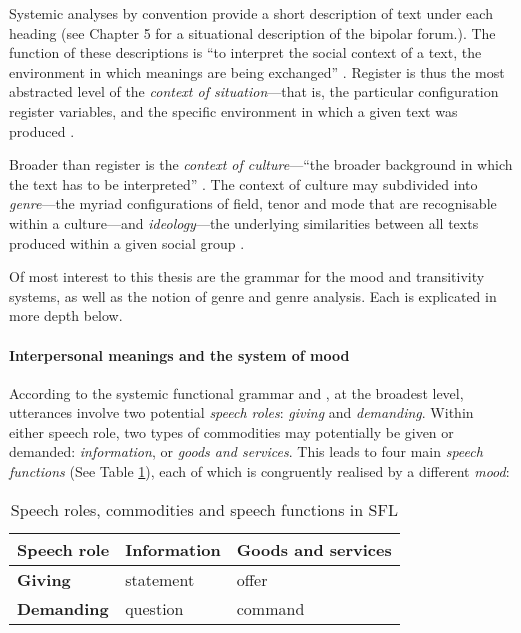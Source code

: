 	  Systemic analyses by convention provide a short description of text under each heading (see Chapter 5 for a situational description of the bipolar forum.). The function of these descriptions is ``to interpret the social context of a text, the environment in which meanings are being exchanged'' \cite[p.~12]{halliday_language_1989}. Register is thus the most abstracted level of the \emph{context of situation}---that is, the particular configuration register variables, and the specific environment in which a given text was produced \cite[p.~30]{eggins_introduction_2004}. 

	  Broader than register is the \emph{context of culture}---``the broader background in which the text has to be interpreted'' \cite[p.~46]{halliday_language_1989}. The context of culture may subdivided into \emph{genre}---the  myriad configurations of field, tenor and mode that are recognisable within a culture---and \emph{ideology}---the underlying similarities between all texts produced within a given social group \cite{eggins_introduction_2004,fairclough_language_2001}.

	  Of most interest to this thesis are the grammar for the mood and transitivity systems, as well as the notion of genre and genre analysis. Each is explicated in more depth below.

		 \paragraph{Interpersonal meanings and the system of mood} \label{par:mood}

			According to the systemic functional grammar \textcite<as outlined in>{eggins_introduction_2004} and \textcite{butt_using_2009}, at the broadest level, utterances involve two potential \emph{speech roles}: \emph{giving} and \emph{demanding}. Within either speech role, two types of commodities may potentially be given or demanded: \emph{information}, or \emph{goods and services}. This leads to four main \emph{speech functions} (See Table \ref{tab:roles}), each of which is congruently realised by a different \emph{mood}:

			\begin{table}
			\centering\small
			\begin{tabular}{|l|l|l|}
			\hline
			\textbf{Speech role} & \textbf{Information} & \textbf{Goods and services} \\ \hline
			\textbf{Giving}	  & statement   & offer			  \\ \hline
			\textbf{Demanding}   & question	& command			\\ \hline
			\end{tabular}
			\caption{Speech roles, commodities and speech functions in SFL}
			\label{tab:roles}
			\end{table}			

